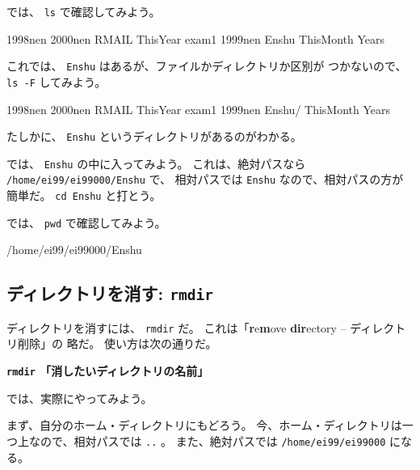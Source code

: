 では、 \texttt{ls} で確認してみよう。

\begin{progls}
1998nen         2000nen         RMAIL           ThisYear       exam1
1999nen         Enshu           ThisMonth       Years
%
\end{progls}

これでは、 \texttt{Enshu} はあるが、ファイルかディレクトリか区別が
つかないので、 \texttt{ls -F} してみよう。

\begin{progls}
1998nen         2000nen         RMAIL           ThisYear       exam1
1999nen         Enshu/          ThisMonth       Years
%
\end{progls}

たしかに、 \texttt{Enshu} というディレクトリがあるのがわかる。

では、 \texttt{Enshu} の中に入ってみよう。
これは、絶対パスなら \texttt{/home/ei99/ei99000/Enshu} で、
相対パスでは \texttt{Enshu} なので、相対パスの方が簡単だ。
 \texttt{cd Enshu} と打とう。

\begin{progls}
%
\end{progls}

では、 \texttt{pwd} で確認してみよう。

\begin{progls}
/home/ei99/ei99000/Enshu
%
\end{progls}

\subsection{ディレクトリを消す: \texttt{rmdir}}

ディレクトリを消すには、 \texttt{rmdir} だ。
これは「\textbf{r}e\textbf{m}ove \textbf{dir}ectory -- ディレクトリ削除」の
略だ。
使い方は次の通りだ。

\begin{center}
\begin{minipage}{10cm}
\begin{shadebox}
\smallskip
{\Large\bf \texttt{rmdir} 「消したいディレクトリの名前」}
\smallskip
\end{shadebox}
\end{minipage}
\end{center}

では、実際にやってみよう。

まず、自分のホーム・ディレクトリにもどろう。
今、ホーム・ディレクトリは一つ上なので、相対パスでは \texttt{..} 。
また、絶対パスでは \texttt{/home/ei99/ei99000} になる。

